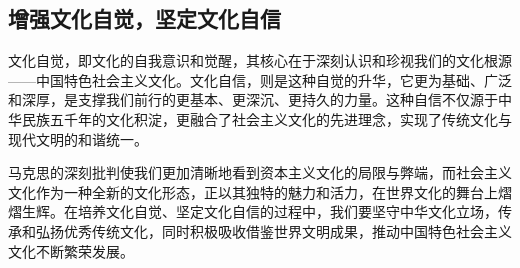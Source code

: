 \subsection{增强文化自觉，坚定文化自信}
文化自觉，即文化的自我意识和觉醒，其核心在于深刻认识和珍视我们的文化根源——中国特色社会主义文化。文化自信，则是这种自觉的升华，它更为基础、广泛和深厚，是支撑我们前行的更基本、更深沉、更持久的力量。这种自信不仅源于中华民族五千年的文化积淀，更融合了社会主义文化的先进理念，实现了传统文化与现代文明的和谐统一。

马克思的深刻批判使我们更加清晰地看到资本主义文化的局限与弊端，而社会主义文化作为一种全新的文化形态，正以其独特的魅力和活力，在世界文化的舞台上熠熠生辉。在培养文化自觉、坚定文化自信的过程中，我们要坚守中华文化立场，传承和弘扬优秀传统文化，同时积极吸收借鉴世界文明成果，推动中国特色社会主义文化不断繁荣发展。
